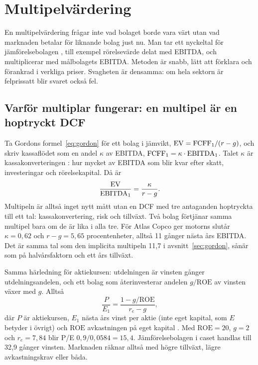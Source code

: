 \section{Multipelvärdering}
\label{sec:multiplar}

En multipelvärdering  frågar inte vad bolaget
borde vara värt utan vad marknaden betalar för liknande bolag just nu. Man tar ett nyckeltal
för jämförelsebolagen , till exempel rörelsevärde delat med EBITDA, och multiplicerar
med målbolagets EBITDA. Metoden är snabb, lätt att förklara och förankrad i verkliga priser.
Svagheten är densamma: om hela sektorn är felprissatt blir svaret också fel.

\subsection{Varför multiplar fungerar: en multipel är en hoptryckt DCF}

Ta Gordons formel~\eqref{eq:gordon} för ett bolag i jämvikt, $\mathrm{EV} = \mathrm{FCFF}_1/(r-g)$, och skriv
kassaflödet som en andel $\kappa$ av EBITDA, $\mathrm{FCFF}_1 = \kappa \cdot \mathrm{EBITDA}_1$. Talet $\kappa$
är kassakonverteringen : hur mycket av EBITDA som blir kvar efter skatt,
investeringar och rörelsekapital. Då är
\begin{equation}
  \frac{\mathrm{EV}}{\mathrm{EBITDA}_1} = \frac{\kappa}{r-g} .
  \label{eq:multipel-dcf}
\end{equation}
Multipeln är alltså inget nytt mått utan en DCF med tre antaganden hoptryckta till ett tal:
kassakonvertering, risk och tillväxt. Två bolag förtjänar samma multipel bara om de är lika i
alla tre. För Atlas Copco ger motorns slutår $\kappa = 0,62$ och $r - g = 5,65$
procentenheter, alltså 11 gånger nästa års EBITDA. Det är samma tal som den implicita
multipeln 11,7 i avsnitt~\ref{sec:gordon}, sånär som på halvårsfaktorn och ett års tillväxt.

Samma härledning för aktiekursen: utdelningen är vinsten gånger utdelningsandelen, och ett
bolag som återinvesterar andelen $g/\mathrm{ROE}$ av vinsten växer med $g$. Alltså
\begin{equation}
  \frac{P}{E_1} = \frac{1 - g/\mathrm{ROE}}{r_e - g} ,
  \label{eq:pe}
\end{equation}
där $P$ är aktiekursen, $E_1$ nästa års vinst per aktie (inte eget kapital, som $E$ betyder i
övrigt) och $\mathrm{ROE}$ avkastningen på eget kapital . Med
$\mathrm{ROE} = 20$\pct, $g = 2$\pct{} och $r_e = 7,84$\pct{} blir P/E
$0,9 / 0,0584 = 15,4$. Jämförelsebolagen i caset handlas till 32,9 gånger vinsten. Marknaden
räknar alltså med högre tillväxt, lägre avkastningskrav eller båda.


